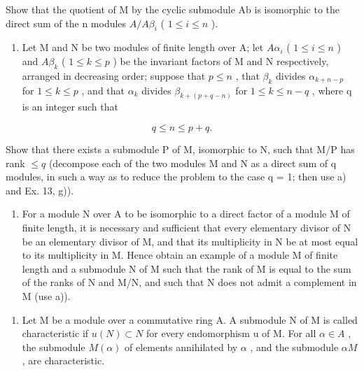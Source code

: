 Show that the quotient of M by the cyclic submodule Ab is isomorphic to the direct sum of the n modules \(A/A\beta_{i}\) ( \(1 \leq i \leq n\) ).

\begin{enumerate}
\def\labelenumi{\alph{enumi})}
\setcounter{enumi}{1}
\tightlist
\item
  Let M and N be two modules of finite length over A; let \(A\alpha_{i}\) ( \(1 \leqslant i \leqslant n\) ) and \(A\beta_{k}\) ( \(1 \leqslant k \leqslant p\) ) be the invariant factors of M and N respectively, arranged in decreasing order; suppose that \(p \leqslant n\) , that \(\beta_{k}\) divides \(\alpha_{k+n-p}\) for \(1 \leqslant k \leqslant p\) , and that \(\alpha_{k}\) divides \(\beta_{k+(p+q-n)}\) for \(1 \leqslant k \leqslant n-q\) , where q is an integer such that
\end{enumerate}

\[
q \leqslant n \leqslant p + q.
\]

Show that there exists a submodule P of M, isomorphic to N, such that M/P has rank \(\leq q\) (decompose each of the two modules M and N as a direct sum of q modules, in such a way as to reduce the problem to the case q = 1; then use a) and Ex. 13, g)).

\begin{enumerate}
\def\labelenumi{\alph{enumi})}
\setcounter{enumi}{2}
\tightlist
\item
  For a module N over A to be isomorphic to a direct factor of a module M of finite length, it is necessary and sufficient that every elementary divisor of N be an elementary divisor of M, and that its multiplicity in N be at most equal to its multiplicity in M. Hence obtain an example of a module M of finite length and a submodule N of M such that the rank of M is equal to the sum of the ranks of N and M/N, and such that N does not admit a complement in M (use a)).
\end{enumerate}

\begin{enumerate}
\def\labelenumi{\arabic{enumi})}
\setcounter{enumi}{15}
\tightlist
\item
  Let M be a module over a commutative ring A. A submodule N of M is called characteristic if \(u(N) \subset N\) for every endomorphism u of M. For all \(\alpha \in A\) , the submodule \(M(\alpha)\) of elements annihilated by \(\alpha\) , and the submodule \(\alpha M\) , are characteristic.
\end{enumerate}

